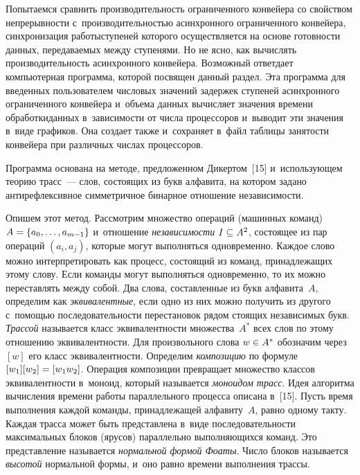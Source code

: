 \begin{multicols}{2}
  Попытаемся сравнить производительность огра\-ни\-чен\-но\-го конвейера со 
свойством непрерывности с~производительностью асинхронного 
ограниченного конвейера, синхронизация работы\linebreak ступеней которого 
осуществляется на основе го\-тов\-ности данных, передаваемых между 
ступенями. Но не ясно, как вычислять производительность асинхронного 
конвейера. Возможный ответ\linebreak дает компьютерная программа, которой 
посвящен данный раздел. Эта программа для введенных пользователем 
числовых значений задержек ступеней асинхронного ограниченного 
конвейера и~объема данных вычисляет значения времени обработки\linebreak данных 
в~зависимости от чис\-ла процессоров и~выводит эти значения в~виде 
графиков. Она создает также и~сохраняет в~файл таб\-ли\-цы за\-ня\-тости 
конвейера при различных чис\-лах процессоров.
  
  Программа основана на методе, предложенном Дикертом~[15] 
и~использующем теорию трасс~--- слов, состоящих из букв алфавита, на 
котором задано антирефлексивное симметричное бинарное отношение 
независимости. 
  
  Опишем этот метод. Рассмотрим множество операций (машинных 
команд) $A\hm= \{a_0, \ldots , a_{m-1}\}$ и~отношение 
\textit{независимости} $I\hm\subseteq A^2$, состоящее из пар операций 
$(a_i,a_j)$, которые могут выполняться одновременно. Каждое слово можно 
интерпретировать как процесс, состоящий из команд, принадлежащих этому 
слову. Если команды могут выполняться одновременно, то их можно 
переставлять между собой. Два слова, составленные из букв алфавита~$A$, 
определим как \textit{эквивалентные}, если одно из них можно получить из 
другого с~по\-мощью последовательности перестановок рядом стоящих 
независимых букв. \textit{Трассой} называется класс эквивалентности 
множества~$A^*$ всех слов по этому отношению эквивалентности. Для 
произвольного слова $w\hm\in A^*$ обозначим через~$[w]$ его класс 
эквивалентности. Определим \textit{композицию} по формуле 
$[w_1][w_2]\hm=[w_1 w_2]$. Операция композиции превращает множество 
классов эк\-ви\-ва\-лент\-ности в~моноид, который называется \textit{моноидом 
трасс}. Идея алгоритма вычисления времени работы параллельного 
процесса описана в~[15]. Пусть время выполнения каждой команды, 
принадлежащей алфавиту~$A$, равно одному такту. Каждая трасса может 
быть представлена в~виде последовательности максимальных блоков 
(ярусов) параллельно выполняющихся команд. Это представление 
называется \textit{нормальной формой Фоаты}. Число блоков называется 
\textit{высотой} нормальной формы, и~оно равно времени выполнения 
трассы.
  

\end{multicols}
